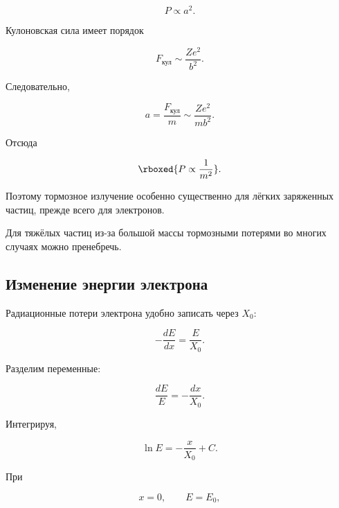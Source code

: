 \documentclass[../final.tex]{subfiles}
\begin{document}
\begin{equation*}
    P\propto a^2.
\end{equation*}

Кулоновская сила имеет порядок

\begin{equation*}
    F_{\text{кул}}
    \sim
    \frac{Ze^2}{b^2}.
\end{equation*}

Следовательно,

\begin{equation*}
    a
    =
    \frac{F_{\text{кул}}}{m}
    \sim
    \frac{Ze^2}{mb^2}.
\end{equation*}

Отсюда

\begin{equation*}
    \rboxed{
        P\propto\frac{1}{m^2}
    }.
\end{equation*}

Поэтому тормозное излучение особенно существенно
для лёгких заряженных частиц, прежде всего для электронов.

Для тяжёлых частиц из-за большой массы
тормозными потерями во многих случаях можно пренебречь.


\subsection*{Изменение энергии электрона}

Радиационные потери электрона удобно записать через $X_0$:

\begin{equation*}
    -
    \frac{dE}{dx}
    =
    \frac{E}{X_0}.
\end{equation*}

Разделим переменные:

\begin{equation*}
    \frac{dE}{E}
    =
    -
    \frac{dx}{X_0}.
\end{equation*}

Интегрируя,

\begin{equation*}
    \ln E
    =
    -
    \frac{x}{X_0}
    +C.
\end{equation*}

При

\begin{equation*}
    x=0,
    \qquad
    E=E_0,
\end{equation*}
\end{document}
